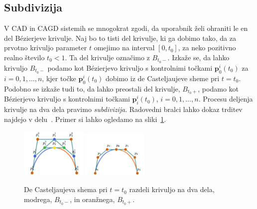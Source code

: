 \documentclass[isrm2, tisk]{fmfdelo}
\newcommand{\p}{\mathbf{p}}
\newcommand{\groupimagewidth}{0.28\textwidth}
\begin{document}
    \subsection{Subdivizija}
    V CAD in CAGD sistemih se mnogokrat zgodi, da uporabnik želi ohraniti le en del Bézierjeve krivulje.
    Naj bo to tisti del krivulje, ki ga dobimo tako, da za prvotno krivuljo parameter $t$ omejimo na interval $[0,t_0]$, za neko pozitivno realno število $t_0<1$.
    Ta del krivulje označimo z $B_{t_0-}$.
    Izkaže se, da lahko krivuljo $B_{t_0-}$ podamo kot Bézierjevo krivuljo s kontrolnimi točkami $\p_0^i(t_0)$ za $i=0,1,\ldots,n$, kjer točke $\p_0^i(t_0)$ dobimo iz de Casteljaujeve sheme pri $t=t_0$.
    Podobno se izkaže tudi to, da lahko preostali del krivulje, $B_{t_0+}$, podamo kot Bézierjevo krivuljo s kontrolnimi točkami $\p_i^i(t_0)$,  $i=0,1,\ldots,n$.
    Procesu deljenja krivulje na dva dela pravimo \textit{subdivizija}.
    Radovedni bralci lahko dokaz trditev najdejo v delu~\cite{farouki}.
    Primer si lahko ogledamo na sliki~\ref{fig:subdivizija}.
    \begin{figure}[h]
        \centering
        \includegraphics[width=\groupimagewidth]{images/subdivizija}
        \qquad
        \includegraphics[width=\groupimagewidth]{images/subdivision-split}
        \caption{De Casteljaujeva shema pri $t=t_0$ razdeli krivuljo na dva dela, modrega, $B_{t_0-}$, in oranžnega, $B_{t_0+}$. }
        \label{fig:subdivizija}
    \end{figure}
\end{document}
